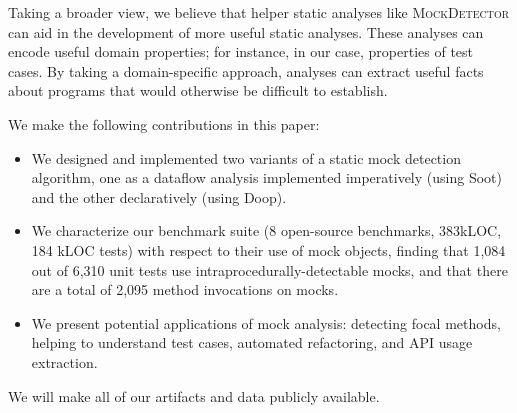 Taking a broader view, we believe that helper static analyses like \textsc{MockDetector} 
can aid
in the development of more useful static analyses. These analyses can
encode useful domain properties; for instance, in our case, properties
of test cases. By taking a domain-specific approach, analyses can extract
useful facts about programs that would otherwise be difficult to establish.

We make the following contributions in this paper:
\begin{itemize}
	\item We designed and implemented two variants of a static mock detection algorithm, one as a dataflow analysis implemented imperatively (using Soot) and the other declaratively (using Doop).
	\item We characterize our benchmark suite (8 open-source benchmarks, 383kLOC, 184 kLOC tests) with respect to their use of mock objects, finding that 1,084 out of 6,310 unit tests use intraprocedurally-detectable mocks, and that there are a total of 2,095 method invocations on mocks. %
	\item We present potential applications of mock analysis: detecting focal methods, helping to understand test cases, automated refactoring, and API usage extraction.
\end{itemize}

We will make all of our artifacts and data publicly available.

